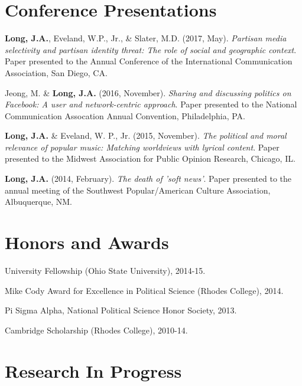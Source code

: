 \documentclass[margin,line]{res}
\begin{document}
\begin{resume}
\section{\sc Conference Presentations}

{\bf Long, J.A.}, Eveland, W.P., Jr., \& Slater, M.D. (2017, May). \emph{Partisan media selectivity and partisan identity threat: The role of social and geographic context}. Paper presented to the Annual Conference of the International Communication Association, San Diego, CA.

Jeong, M. \&  {\bf Long, J.A.} (2016, November). \emph{Sharing and discussing politics on Facebook: A user and network-centric approach}. Paper presented to the National Communication Assocation Annual Convention, Philadelphia, PA.

{\bf Long, J.A.} \& Eveland, W. P., Jr. (2015, November). \emph{The political and moral relevance of popular music: Matching worldviews with lyrical content}. Paper presented to the Midwest Association for Public Opinion Research, Chicago, IL.


{\bf Long, J.A.} (2014, February). \emph{The death of 'soft news'}. Paper presented to the annual meeting of the Southwest Popular/American Culture Association, Albuquerque, NM.


\section{\sc Honors and Awards} 
University Fellowship (Ohio State University), 2014-15.

\vspace*{-2.5mm}
Mike Cody Award for Excellence in Political Science (Rhodes College), 2014.

\vspace*{-2.5mm}
Pi Sigma Alpha, National Political Science Honor Society, 2013.

\vspace*{-2.5mm}
Cambridge Scholarship (Rhodes College), 2010-14.

\section{\sc Research In Progress} 


\end{resume}
\end{document}
